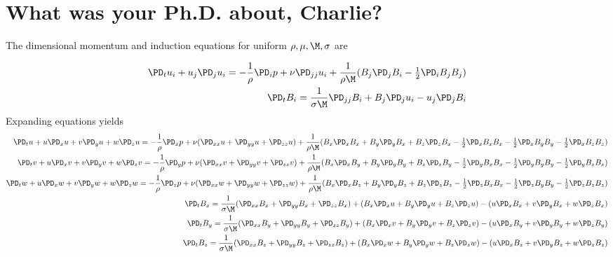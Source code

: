 \documentclass[11pt]{article}
\begin{document}
\doublespacing
\maketitle

\section{What was your Ph.D. about, Charlie?}

The dimensional momentum and induction equations for uniform $\rho,\mu,\M,\sigma$ are

\begin{equation}\begin{aligned}
\PD_t u_i+u_j\PD_j u_i = - \frac{1}{\rho} \PD_i p+ \nu \PD_{jj} u_i + \frac{1}{\rho \M} (B_j \PD_j B_i - \tfrac{1}{2} \PD_i B_j B_j) \\
\PD_t B_i = \frac{1}{\sigma \M} \PD_{jj} B_i + B_j \PD_j u_i - u_j \PD_j B_i
\end{aligned} \end{equation}
Expanding equations yields
\tiny\begin{equation}\begin{aligned}
\PD_t u+ u\PD_x u + v\PD_y u + w\PD_z u = -\frac{1}{\rho}\PD_x p+ \nu (\PD_{xx} u+\PD_{yy} u+\PD_{zz} u) + \frac{1}{\rho \M} (B_x \PD_x B_x + B_y \PD_y B_x + B_z \PD_z B_x-\tfrac{1}{2}\PD_x B_x B_x-\tfrac{1}{2}\PD_x B_y B_y-\tfrac{1}{2}\PD_x B_z B_z) \\
\PD_t v+ u\PD_x v + v\PD_y v + w\PD_z v = -\frac{1}{\rho}\PD_y p+ \nu (\PD_{xx} v+\PD_{yy} v+\PD_{zz} v) + \frac{1}{\rho \M} (B_x \PD_x B_y + B_y \PD_y B_y + B_z \PD_z B_y-\tfrac{1}{2}\PD_y B_x B_x-\tfrac{1}{2}\PD_y B_y B_y-\tfrac{1}{2}\PD_y B_z B_z) \\
\PD_t w+ u\PD_x w + v\PD_y w + w\PD_z w = -\frac{1}{\rho}\PD_z p+ \nu (\PD_{xx} w+\PD_{yy} w+\PD_{zz} w) + \frac{1}{\rho \M} (B_x \PD_x B_z + B_y \PD_y B_z + B_z \PD_z B_z-\tfrac{1}{2}\PD_z B_x B_x-\tfrac{1}{2}\PD_z B_y B_y-\tfrac{1}{2}\PD_z B_z B_z) \\
\PD_t B_x = \frac{1}{\sigma \M} (\PD_{xx} B_x + \PD_{yy} B_x+\PD_{zz} B_x) + (B_x\PD_x u+B_y\PD_y u+B_z\PD_z u) - (u\PD_x B_x+v\PD_y B_x+w\PD_z B_x) \\
\PD_t B_y = \frac{1}{\sigma \M} (\PD_{xx} B_y + \PD_{yy} B_y+\PD_{zz} B_y) + (B_x\PD_x v+B_y\PD_y v+B_z\PD_z v) - (u\PD_x B_y+v\PD_y B_y+w\PD_z B_y) \\
\PD_t B_z = \frac{1}{\sigma \M} (\PD_{xx} B_z + \PD_{yy} B_z+\PD_{zz} B_z) + (B_x\PD_x w+B_y\PD_y w+B_z\PD_z w) - (u\PD_x B_z+v\PD_y B_z+w\PD_z B_z) \\
\end{aligned} \end{equation}\normalsize
\end{document}
